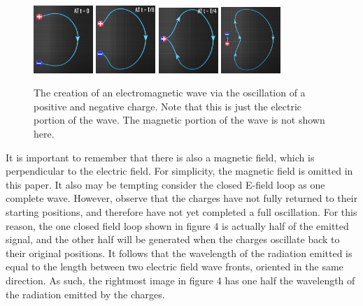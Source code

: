 \documentclass[12pt]{article}
\begin{document}
\begin{figure}[h]
    \centering
    \includegraphics[width=0.20\textwidth]{dipole-at-t0.png} 
    \includegraphics[width=0.20\textwidth]{dipole-at-t1.png}
    \includegraphics[width=0.20\textwidth]{dipole-at-t2.png}
    \includegraphics[width=0.20\textwidth]{dipole-at-t3.png}
    \caption{The creation of an electromagnetic wave via the oscillation of a positive and negative charge. Note that this is just the electric portion of the wave. The magnetic portion of the wave is not shown here.\cite{lesic}}
\end{figure}

It is important to remember that there is also a magnetic field, which is perpendicular to the electric field. For simplicity, the magnetic field is omitted in this paper. It also may be tempting consider the closed E-field loop as one complete wave. However, observe that the charges have not fully returned to their starting positions, and therefore have not yet completed a full oscillation. For this reason, the one closed field loop shown in figure 4 is actually half of the emitted signal, and the other half will be generated when the charges oscillate back to their original positions. It follows that the wavelength of the radiation emitted is equal to the length between two electric field wave fronts, oriented in the same direction. As such, the rightmost image in figure 4 has one half the wavelength of the radiation emitted by the charges.
\end{document}
